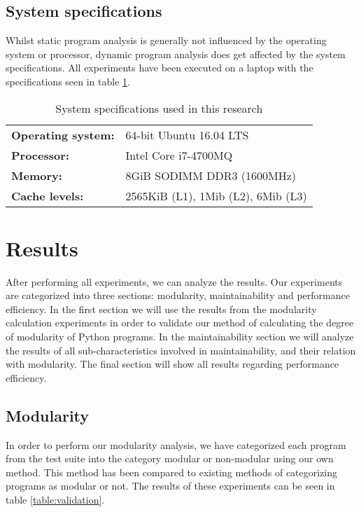 \documentclass[twoside]{uva-inf-bachelor-thesis}
\begin{document}
\section{System specifications}
Whilst static program analysis is generally not influenced by the operating system or processor, dynamic program analysis does get affected by the system specifications. All experiments have been executed on a laptop with the specifications seen in table \ref{table:specifications}.
\begin{table}[H]
\centering
\caption{System specifications used in this research}
\label{table:specifications}
\begin{tabular}{ll}
\textbf{Operating system:} & 64-bit Ubuntu 16.04 LTS    \\
\textbf{Processor:}        & Intel Core i7-4700MQ       \\
\textbf{Memory:}           & 8GiB SODIMM DDR3 (1600MHz) \\
\textbf{Cache levels:}     & 2565KiB (L1), 1Mib (L2), 6Mib (L3) \\
\end{tabular}
\end{table}

\chapter{Results}
\label{chapter:results}
After performing all experiments, we can analyze the results. Our experiments are categorized into three sections: modularity, maintainability and performance efficiency. In the first section we will use the results from the modularity calculation experiments in order to validate our method of calculating the degree of modularity of Python programs. In the maintainability section we will analyze the results of all sub-characteristics involved in maintainability, and their relation with modularity. The final section will show all results regarding performance efficiency.

\section{Modularity}
In order to perform our modularity analysis, we have categorized each program from the test suite into the category modular or non-modular using our own method. This method has been compared to existing methods of categorizing programs as modular or not. The results of these experiments can be seen in table \ref{table:validation}.
\end{document}
